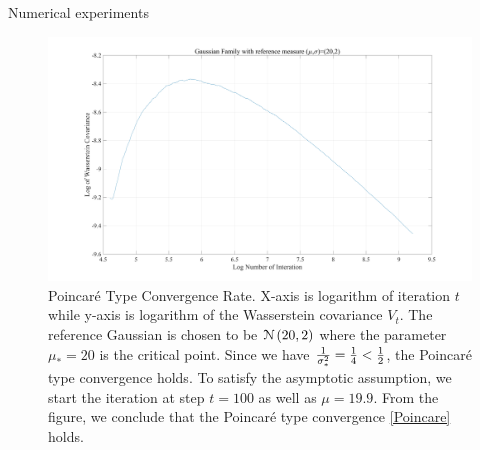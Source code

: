 \documentclass{beamer}
\begin{document}
\begin{frame}{Numerical experiments}
\begin{figure}[H]
  \includegraphics[width=0.7\linewidth]{Po2.jpg}
  \caption{Poincar\'{e} Type Convergence Rate. X-axis is logarithm of iteration $t$ while y-axis is logarithm of the Wasserstein covariance $V_t$. The reference Gaussian is chosen to be $\mathcal{N}\left( 20, 2 \right)$ where the parameter $\mu_* = 20$ is the critical point. Since we have $\frac{1}{\sigma_*^2} = \frac{1}{4} < \frac{1}{2}$, the Poincar\'{e} type convergence holds. To satisfy the asymptotic assumption, we start the iteration at step $t = 100$ as well as $\mu = 19.9$. From the figure, we conclude that the Poincar\'{e} type convergence \eqref{Poincare} holds.}
  \label{fig:Po}
\end{figure}
\end{frame}
\end{document}
